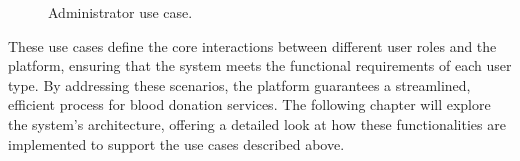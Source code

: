 \begin{figure}[h]
	\begin{center}
	\end{center}
	\caption{Administrator use case.}\label{fig:administrator_use_case}
\end{figure}

These use cases define the core interactions between different user roles and the platform, ensuring that the system meets the functional requirements of each user type. By addressing these scenarios, the platform guarantees a streamlined, efficient process for blood donation services. The following chapter will explore the system's architecture, offering a detailed look at how these functionalities are implemented to support the use cases described above.